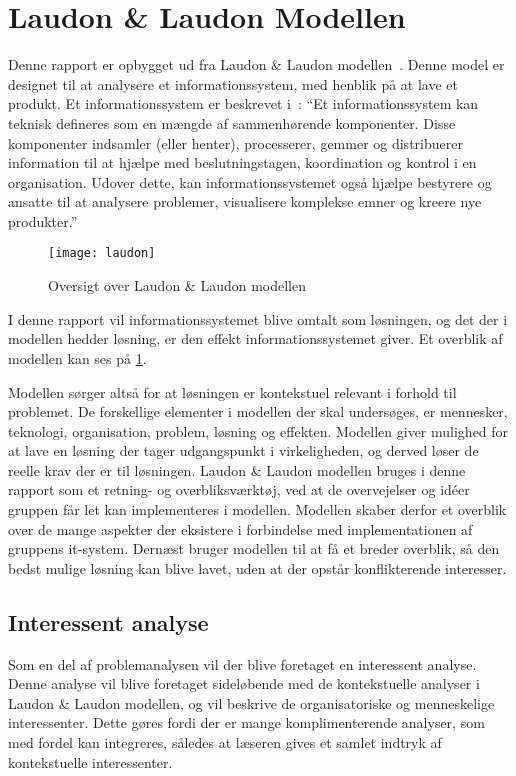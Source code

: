 \section{Laudon \& Laudon Modellen}
Denne rapport er opbygget ud fra Laudon \& Laudon modellen~\cite{laudon}. Denne model er designet til at analysere et informationssystem, med henblik på at lave et produkt. Et informationssystem er beskrevet i~\cite{laudon2006management}: \enquote{Et informationssystem kan teknisk defineres som en mængde af sammenhørende komponenter. Disse komponenter indsamler (eller henter), processerer, gemmer og distribuerer information til at hjælpe med beslutningstagen, koordination og kontrol i en organisation. Udover dette, kan informationssystemet også hjælpe bestyrere og ansatte til at analysere problemer, visualisere komplekse emner og kreere nye produkter.}

\begin{figure}
  \centering
  \texttt{[image: laudon]}
	\caption{Oversigt over Laudon \& Laudon modellen}
	\label{fig:oversigt_laudon}
\end{figure}

I denne rapport vil informationssystemet blive omtalt som løsningen, og det der i modellen hedder løsning, er den effekt informationssystemet giver. Et overblik af modellen kan ses på \cref{fig:oversigt_laudon}. 

Modellen sørger altså for at løsningen er kontekstuel relevant i forhold til problemet. De forskellige elementer i modellen der skal undersøges, er mennesker, teknologi, organisation, problem, løsning og effekten. Modellen giver mulighed for at lave en løsning der tager udgangspunkt i virkeligheden, og derved løser de reelle krav der er til løsningen. Laudon & Laudon modellen bruges i denne rapport som et retning- og overbliksværktøj, ved at de overvejelser og idéer gruppen får let kan implementeres i modellen. Modellen skaber derfor et overblik over de mange aspekter der eksistere i forbindelse med implementationen af gruppens it-system. Dernæst bruger modellen til at få et breder overblik, så den bedst mulige løsning kan blive lavet, uden at der opstår konflikterende interesser.

\subsection{Interessent analyse}

Som en del af problemanalysen vil der blive foretaget en interessent analyse. Denne analyse vil blive foretaget sideløbende med de kontekstuelle analyser i Laudon \& Laudon modellen, og vil beskrive de organisatoriske og menneskelige interessenter. Dette gøres fordi der er mange komplimenterende analyser, som med fordel kan integreres, således at læseren gives et samlet indtryk af kontekstuelle interessenter. 
